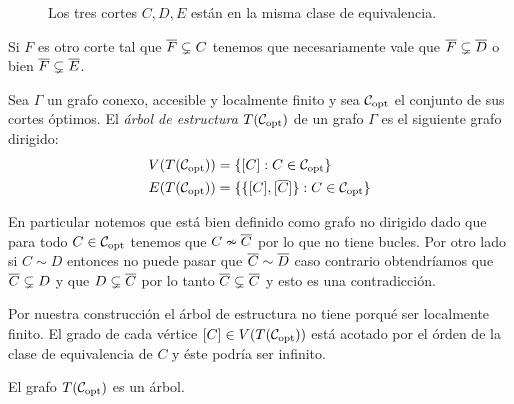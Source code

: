 \documentclass[tesis.tex]{subfiles}
\begin{document}
\begin{ej}
\begin{figure}[H]
		\caption{\small{Los tres cortes $C,D,E$ están en la misma clase de equivalencia.}}
	\end{figure}

	Si $F$ es otro corte tal que $\overline F \subsetneq C$ tenemos que necesariamente vale que $\overline F \subsetneq \overline D$ o bien $\overline F \subsetneq \overline E$.
\end{ej}

\begin{deff}
	Sea $\Gamma$ un grafo conexo, accesible y localmente finito y sea ${\cal C}_{\text{opt}}$ el conjunto de sus cortes óptimos.
	El \emph{árbol de estructura} $T({\cal C}_{\text{opt}})$ de un grafo $\Gamma$ es el siguiente grafo dirigido:
	\begin{align*}
		V(T({\cal C}_{\text{opt}})) &= \{ [C] : C \in {\cal C}_{\text{opt}} \} \\
		E(T({\cal C}_{\text{opt}})) &= \{ \{ [C], [\overline C] \} : C \in {\cal C}_{\text{opt}}   \}
	\end{align*}
\end{deff}

En particular notemos que está bien definido como grafo no dirigido dado que para todo $C \in {\cal C}_{\text{opt}}$ tenemos que $C \nsim \overline C$ por lo que no tiene bucles.
Por otro lado si $C \sim D$ entonces no puede pasar que $\overline C \sim \overline D$ caso contrario obtendríamos que $\overline C \subsetneq D$ y que $D \subsetneq \overline C$ por lo tanto $\overline C \subsetneq \overline C$ y esto es una contradicción.

\begin{obs}
	Por nuestra construcción el árbol de estructura no tiene porqué ser localmente finito.
	El grado de cada vértice $[C] \in V(T({\cal C}_{\text{opt}}))$ está acotado por el órden de la clase de equivalencia de $C$ y éste podría ser infinito.
\end{obs}


\begin{prop}
	El grafo $T({\cal C}_{\text{opt}})$ es un árbol.
\end{prop}
\end{document}
